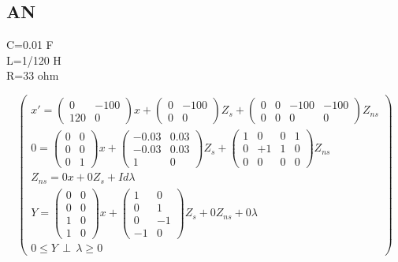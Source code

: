 \documentclass[10pt]{article}
\begin{document}
\subsection{AN}
C=0.01 F\\
L=1/120 H\\
R=33 ohm

\[
\left(\begin{array}{c}
  
x'=\left(\begin{array}{cc}
0 &-100\\
120&0\end{array} \right)x
+\left(\begin{array}{cc}
0&-100\\
0&0\end{array} \right)Z_{s}
+\left(\begin{array}{cccc}
0&0&-100&-100\\
0&0&0&0\end{array} \right)Z_{ns}
\\
0=\left(\begin{array}{cc}
0 &0\\
0 &0\\
0 &1\end{array} \right)x
+\left(\begin{array}{cc}
-0.03&0.03\\
-0.03&0.03\\
1 &0\end{array} \right)Z_{s}
+\left(\begin{array}{cccc}
1&0&0&1\\
0&+1&1&0\\
0&0&0&0\end{array} \right)Z_{ns}
\\
Z_{ns}=0x+0Z_{s}+Id\lambda\\
Y=\left(\begin{array}{cc}
0&0\\
0&0\\
1&0\\
1&0\end{array}\right) x+
\left(\begin{array}{cc}
1&0\\
0&1\\
0&-1\\
-1&0\end{array}
\right) Z_{s} + 0Z_{ns} +0\lambda\\

0 \leq Y \, \perp \, \lambda \geq 0

\end{array}
\right)
\]
\end{document}
